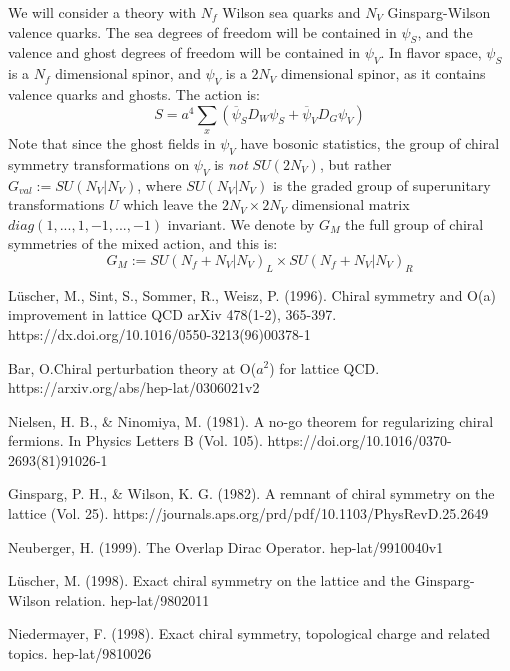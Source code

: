 \documentclass[11pt, oneside]{article}   	%
\theoremstyle{definition}
\begin{document}
We will consider a theory with $N_f$ Wilson sea quarks and $N_V$ Ginsparg-Wilson valence quarks. The sea degrees of 
freedom will be contained in $\psi_S$, and the valence and ghost degrees of freedom will be contained in $\psi_V$. In 
flavor space, $\psi_S$ is a $N_f$ dimensional spinor, and $\psi_V$ is a $2N_V$ dimensional spinor, as it contains valence 
quarks and ghosts. The action is:
\begin{equation}
	S = a^4\sum_x\left(\overline\psi_S D_W\psi_S + \overline\psi_V D_G\psi_V\right)
\end{equation}
Note that since the ghost fields in $\psi_V$ have bosonic statistics, the group of chiral symmetry transformations on 
$\psi_V$ is \textit{not} $SU(2N_V)$, but rather $G_{val} := SU(N_V | N_V)$, where $SU(N_V | N_V)$ is the graded group of 
superunitary transformations $U$ which leave the $2N_V\times 2N_V$ dimensional matrix $diag(1, ..., 1, -1, ..., -1)$ invariant. We 
denote by $G_M$ the full group of chiral symmetries of the mixed action, and this is:
\begin{equation}
	G_M := SU(N_f + N_V | N_V)_L\times SU(N_f + N_V | N_V)_R
\end{equation}

\newpage
\thispagestyle{empty}

\begin{thebibliography}{99}

L\"{u}scher, M., Sint, S., Sommer, R., Weisz, P. (1996). Chiral symmetry and O(a) improvement in lattice QCD arXiv  478(1-2), 365-397. https://dx.doi.org/10.1016/0550-3213(96)00378-1

Bar, O.Chiral perturbation theory at O($a^2$) for lattice QCD. https://arxiv.org/abs/hep-lat/0306021v2

Nielsen, H. B., \& Ninomiya, M. (1981). A no-go theorem for regularizing chiral fermions. 
In Physics Letters B (Vol. 105). https://doi.org/10.1016/0370-2693(81)91026-1
	
	Ginsparg, P. H., \& Wilson, K. G. (1982). A remnant of chiral symmetry on the lattice (Vol. 25). 
	https://journals.aps.org/prd/pdf/10.1103/PhysRevD.25.2649
	
	Neuberger, H. (1999). The Overlap Dirac Operator. hep-lat/9910040v1
	
	L\"uscher, M. (1998). Exact chiral symmetry on the lattice and the Ginsparg-Wilson relation. hep-lat/9802011
	
	Niedermayer, F. (1998). Exact chiral symmetry, topological charge and related topics. hep-lat/9810026

\end{thebibliography}
\end{document}
